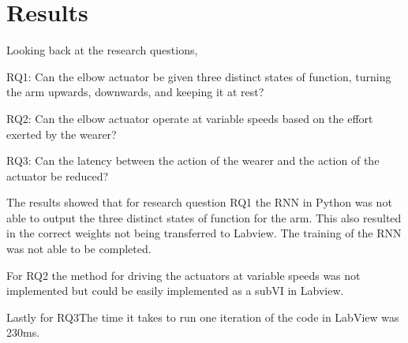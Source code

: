 \section{Results}
\label{section:results}

%
%
%
Looking back at the research questions,

RQ1: Can the elbow actuator be given three distinct states of function, turning the arm upwards, downwards, and keeping it at rest?

RQ2: Can the elbow actuator operate at variable speeds based on the effort exerted by the wearer?

RQ3: Can the latency between the action of the wearer and the action of the actuator be reduced?

The results showed that for research question RQ1 the RNN in Python was not able to output the three distinct states of function for the arm. This also resulted in the correct weights not being transferred to Labview. 
The training of the RNN was not able to be completed. 

For RQ2 the method for driving the actuators at variable speeds was not implemented but could be easily implemented as a subVI in Labview.  

Lastly for RQ3The time it takes to run one iteration of the code in LabView was 230ms.